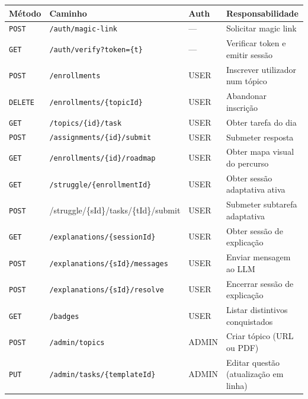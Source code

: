 \begin{table}[htbp]
	\centering
	\small
	\begin{tabular}{p{1.5cm} p{6.0cm} p{1.3cm} p{3.8cm}}
		\toprule
		\textbf{M\'etodo} & \textbf{Caminho} & \textbf{Auth} & \textbf{Responsabilidade} \\
		\midrule
		\texttt{POST}  & \texttt{/auth/magic-link}                        & ---   & Solicitar magic link \\
		\texttt{GET}   & \texttt{/auth/verify?token=\{t\}}                & ---   & Verificar token e emitir sess\~ao \\
		\texttt{POST}  & \texttt{/enrollments}                            & USER  & Inscrever utilizador num t\'opico \\
		\texttt{DELETE}& \texttt{/enrollments/\{topicId\}}                & USER  & Abandonar inscri\c{c}\~ao \\
		\texttt{GET}   & \texttt{/topics/\{id\}/task}                     & USER  & Obter tarefa do dia \\
		\texttt{POST}  & \texttt{/assignments/\{id\}/submit}              & USER  & Submeter resposta \\
		\texttt{GET}   & \texttt{/enrollments/\{id\}/roadmap}             & USER  & Obter mapa visual do percurso \\
		\texttt{GET}   & \texttt{/struggle/\{enrollmentId\}}              & USER  & Obter sess\~ao adaptativa ativa \\
		\texttt{POST}  & {\ttfamily /struggle/\allowbreak\{sId\}/\allowbreak tasks/\allowbreak\{tId\}/\allowbreak submit} & USER  & Submeter subtarefa adaptativa \\
		\texttt{GET}   & \texttt{/explanations/\{sessionId\}}             & USER  & Obter sess\~ao de explica\c{c}\~ao \\
		\texttt{POST}  & \texttt{/explanations/\{sId\}/messages}          & USER  & Enviar mensagem ao LLM \\
		\texttt{POST}  & \texttt{/explanations/\{sId\}/resolve}           & USER  & Encerrar sess\~ao de explica\c{c}\~ao \\
		\texttt{GET}   & \texttt{/badges}                                 & USER  & Listar distintivos conquistados \\
		\texttt{POST}  & \texttt{/admin/topics}                           & ADMIN & Criar t\'opico (URL ou PDF) \\
		\texttt{PUT}   & \texttt{/admin/tasks/\{templateId\}}             & ADMIN & Editar quest\~ao (atualiza\c{c}\~ao em linha) \\

\end{tabular}
\end{table}
